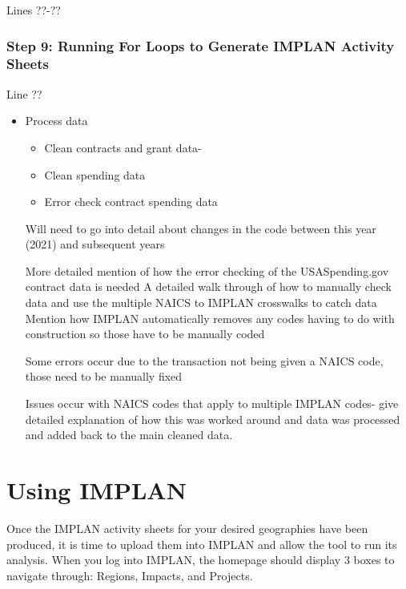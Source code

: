 \documentclass[
]{book}
\providecommand{\tightlist}{%
  \setlength{\itemsep}{0pt}\setlength{\parskip}{0pt}}
\begin{document}
Lines ??-??

\hypertarget{step-9-running-for-loops-to-generate-implan-activity-sheets}{%
\subsection{Step 9: Running For Loops to Generate IMPLAN Activity Sheets}\label{step-9-running-for-loops-to-generate-implan-activity-sheets}}

Line ??

\begin{itemize}
\item
  Process data

  \begin{itemize}
  \tightlist
  \item
    Clean contracts and grant data-
  \item
    Clean spending data
  \item
    Error check contract spending data
  \end{itemize}

  Will need to go into detail about changes in the code between this year (2021) and subsequent years

  More detailed mention of how the error checking of the USASpending.gov contract data is needed
  A detailed walk through of how to manually check data and use the multiple NAICS to IMPLAN crosswalks to catch data
  Mention how IMPLAN automatically removes any codes having to do with construction so those have to be manually coded

  Some errors occur due to the transaction not being given a NAICS code, those need to be manually fixed

  Issues occur with NAICS codes that apply to multiple IMPLAN codes- give detailed explanation of how this was worked around and data was processed and added back to the main cleaned data.
\end{itemize}

\hypertarget{using-implan}{%
\chapter{Using IMPLAN}\label{using-implan}}

Once the IMPLAN activity sheets for your desired geographies have been produced, it is time to upload them into IMPLAN and allow the tool to run its analysis. When you log into IMPLAN, the homepage should display 3 boxes to navigate through: Regions, Impacts, and Projects.
\end{document}

